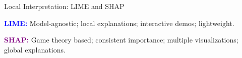 \documentclass[aspectratio=169,11pt]{beamer}
\begin{document}
\begin{frame}{Local Interpretation: LIME and SHAP}

  \begin{center}





  \end{center}

  \iqbsep

  \small
  \textbf{\textcolor{blue}{LIME:}} Model-agnostic; local explanations; interactive demos; lightweight.

  \textbf{\textcolor{purple}{SHAP:}} Game theory based; consistent importance; multiple visualizations; global explanations.
\end{frame}
\end{document}
